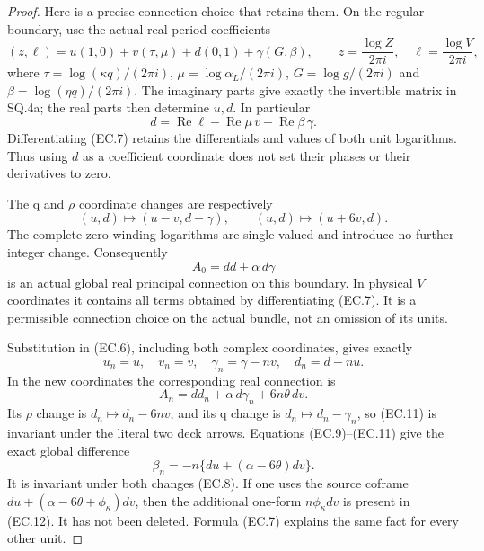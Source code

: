 \begin{proof}
Here is a precise connection choice that retains them. On the regular
boundary, use the actual real period coefficients
\[
 (z,\ell)=u(1,0)+v(\tau,\mu)+d(0,1)+\gamma(G,\beta),
 \qquad z=\frac{\log Z}{2\pi i},\quad
        \ell=\frac{\log V}{2\pi i},
                                                        \tag{EC.6}
\]
where
\(\tau=\log(\kappa q)/(2\pi i)\),
\(\mu=\log\alpha_L/(2\pi i)\),
\(G=\log g/(2\pi i)\) and
\(\beta=\log(\eta q)/(2\pi i)\).
The imaginary parts give exactly the invertible matrix in SQ.4a;
the real parts then determine \(u,d\). In particular
\[
 d=\operatorname{Re}\ell-\operatorname{Re}\mu\,v
                           -\operatorname{Re}\beta\,\gamma.
                                                        \tag{EC.7}
\]
Differentiating (EC.7) retains the differentials and values of both
unit logarithms. Thus using \(d\) as a coefficient coordinate does
not set their phases or their derivatives to zero.

The q and \(\rho\) coordinate changes are respectively
\[
 (u,d)\mapsto(u-v,d-\gamma),\qquad
 (u,d)\mapsto(u+6v,d).
                                                        \tag{EC.8}
\]
The complete zero-winding logarithms are single-valued and introduce
no further integer change. Consequently
\[
 A_0=dd+\alpha\,d\gamma
                                                        \tag{EC.9}
\]
is an actual global real principal connection on this boundary.
In physical \(V\) coordinates it contains all terms obtained by
differentiating (EC.7). It is a permissible connection choice on the
actual bundle, not an omission of its units.

Substitution in (EC.6), including both complex coordinates, gives
exactly
\[
 u_n=u,\quad v_n=v,\quad\gamma_n=\gamma-nv,\quad d_n=d-nu.
                                                        \tag{EC.10}
\]
In the new coordinates the corresponding real connection is
\[
 A_n=dd_n+\alpha\,d\gamma_n+6n\theta\,dv.
                                                        \tag{EC.11}
\]
Its \(\rho\) change is \(d_n\mapsto d_n-6nv\), and its q change is
\(d_n\mapsto d_n-\gamma_n\), so (EC.11) is invariant under the
literal two deck arrows. Equations (EC.9)--(EC.11) give the exact
global difference
\[
 \beta_n=-n\{du+(\alpha-6\theta)dv\}.
                                                        \tag{EC.12}
\]
It is invariant under both changes (EC.8). If one uses the source
coframe \(du+(\alpha-6\theta+\phi_\kappa)dv\), then the additional
one-form \(n\phi_\kappa dv\) is present in (EC.12). It has not been
deleted. Formula (EC.7) explains the same fact for every other unit.


\end{proof}
